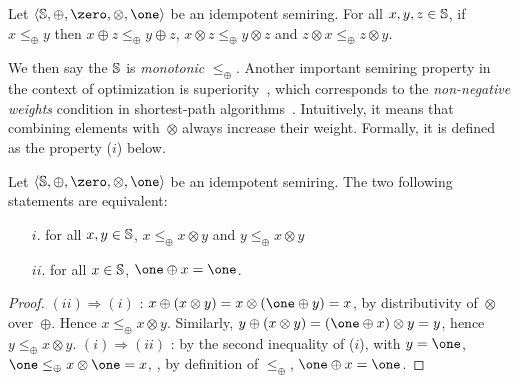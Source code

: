 \begin{lemma} \label{lem:monotonic}
Let $\< \Semiring, \oplus, \zero, \otimes, \one>$ be an idempotent semiring.
For all $x, y, z  \in \mathbb{S}$,
if $x \leq_\oplus y$ then
$x \oplus z \leq_\oplus y \oplus z$,
$x \otimes z \leq_\oplus y \otimes z$
and $z \otimes x \leq_\oplus z \otimes y$.
\end{lemma}

We then say the
$\mathbb{S}$ is \emph{monotonic} \wrt $\leq_\oplus$.
%
Another important semiring property in the context of optimization
is {superiority}~\cite{Huang08advanceddynamic},
which corresponds to the
\emph{non-negative weights} condition in shortest-path algorithms~\cite{Dijkstra59anote}.
Intuitively, it means that combining elements with~$\otimes$ always increase their weight.
Formally, it is defined as the property ($i$) below. %

\begin{lemma}
\label{lem:superior}\label{lem:bounded}
Let $\< \Semiring, \oplus, \zero, \otimes, \one>$ be an idempotent semiring.
The two following statements are equivalent:
\begin{itemize}
\item [$i.$] for all $x, y \in \mathbb{S}$,
$x \leq_\oplus x \otimes y$ and
$y \leq_\oplus x \otimes y$
\item[$ii.$] for all $x \in \mathbb{S}$,  $\one \oplus x = \one$.
\end{itemize}
\end{lemma}
%
\begin{proof} %
$(ii) \Rightarrow (i)$ :
$x \oplus (x \otimes y) = x \otimes (\one \oplus y) = x$,
by distributivity of~$\otimes$ over~$\oplus$.
Hence $x \leq_\oplus x \otimes y$.
Similarly, $y \oplus (x \otimes y) = (\one \oplus x) \otimes y = y$,
hence $y \leq_\oplus x \otimes y$.
%
$(i) \Rightarrow (ii)$ :
by the second inequality of ($i$), with $y = \one$,
$\one \leq_\oplus x \otimes \one = x$, \ie,
by definition of $\leq_\oplus$, $\one \oplus x = \one$.
\end{proof}

